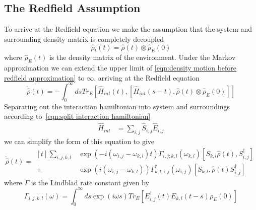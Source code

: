 \subsection{The Redfield Assumption}\label{sec:the redfield assumption}
To arrive at the Redfield equation
we make the assumption that the
system and surrounding density
matrix is completely
decoupled~\cite{theory_open_quantum_systems}
\begin{equation}
    \hat{\rho}_t(t) = \hat{\rho}(t) \otimes \hat{\rho}_E(0)
\end{equation}
where \(\hat{\rho}_E(t)\) is the
density matrix of the environment.
Under the Markov approximation
we can extend the upper limit
of \cref{eqn:density motion before redfield approximation}
to \(\infty \), arriving at the Redfield
equation
\begin{equation}
    \dot{\hat{\rho}}(t) =
    - \int_0^{\infty} ds
    Tr_{E}[\hat{H}_{int}(t),
            [\hat{H}_{int}(s-t),
                    \hat{\rho}(t) \otimes \hat{\rho}_E(0)]]
\end{equation}
Separating out the interaction hamiltonian
into system and surroundings according
to~\cref{eqn:split interaction hamiltonian}
\begin{align}
    \hat{H}_{int} & = \sum_{i,j} \hat{S}_{i,j} \hat{E}_{i,j}
\end{align}
we can simplify the form of this equation\cite{Manzano_2020} to give
\begin{equation}
    \dot{\hat{\rho{}}}(t) = \begin{aligned}[t]
        \sum_{i,j,k, l} &
        \exp{(-i(\omega_{i,j}-\omega_{k,l})t)}
        \Gamma_{i,j;k, l}(\omega_{k,l})
        [S_{k, l}\hat{\rho}(t),
        S^\dagger_{i,j}]  \\
        +               &
        \exp{(i(\omega_{i,j}-\omega_{k,l}))}
        \Gamma^*_{k, l; i,j}(\omega_{i,j})
        [S_{k, l},
            \hat{\rho}(t) S^\dagger_{i,j}]
    \end{aligned} \label{eqn:redfield equation gamma form}
\end{equation}
where \(\Gamma \) is the
Lindblad rate constant given by
\begin{equation}
    \Gamma_{i,j, k,l}(\omega) =
    \int_0^\infty{}{
    ds \exp{(i\omega{}s)}
    Tr_{E}[E^\dagger_{i,j}(t)E_{k,l}(t-s)\rho_E(0)]
    }\label{eqn:gamma definition}
\end{equation}

